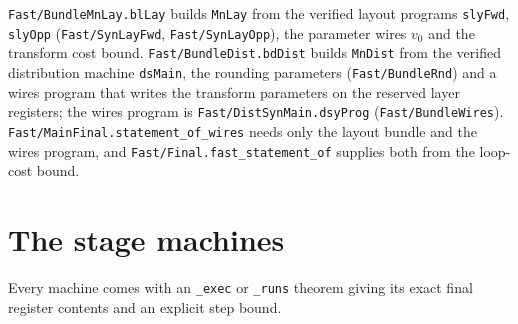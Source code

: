 \documentclass[11pt]{amsart}
\theoremstyle{remark}
\begin{document}
\texttt{Fast/BundleMnLay.blLay} builds \texttt{MnLay} from the verified layout programs
\texttt{slyFwd}, \texttt{slyOpp} (\texttt{Fast/SynLayFwd}, \texttt{Fast/SynLayOpp}), the
parameter wires $v_0$ and the transform cost bound. \texttt{Fast/BundleDist.bdDist} builds
\texttt{MnDist} from the verified distribution machine \texttt{dsMain}, the rounding parameters
(\texttt{Fast/BundleRnd}) and a wires program that writes the transform parameters on the
reserved layer registers; the wires program is \texttt{Fast/DistSynMain.dsyProg}
(\texttt{Fast/BundleWires}). \texttt{Fast/MainFinal.statement\_of\_wires} needs only the layout
bundle and the wires program, and \texttt{Fast/Final.fast\_statement\_of} supplies both from
the loop-cost bound.

\section{The stage machines}

Every machine comes with an \texttt{\_exec} or \texttt{\_runs} theorem giving its exact final
register contents and an explicit step bound.
\end{document}

